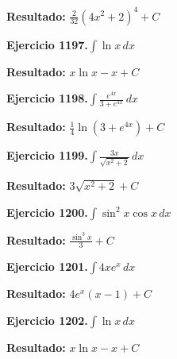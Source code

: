 \documentclass[10pt,a4paper]{article}
\begin{document}
\begin{solbox}
\textbf{Resultado:} \(\displaystyle \frac{2}{32}(4x^2+2)^{4} + C\)
\end{solbox}

\begin{ejbox}
\textbf{Ejercicio 1197.}\quad $\int \ln x\,dx$
\end{ejbox}

\begin{solbox}
\textbf{Resultado:} \(\displaystyle x\ln x - x + C\)
\end{solbox}

\newpage
\begin{ejbox}
\textbf{Ejercicio 1198.}\quad $\int \frac{e^{4x}}{3+e^{4x}}\,dx$
\end{ejbox}

\begin{solbox}
\textbf{Resultado:} \(\displaystyle \frac{1}{4}\ln(3+e^{4x}) + C\)
\end{solbox}

\begin{ejbox}
\textbf{Ejercicio 1199.}\quad $\int \frac{3x}{\sqrt{x^2+2}}\,dx$
\end{ejbox}

\begin{solbox}
\textbf{Resultado:} \(\displaystyle 3\sqrt{x^2+2} + C\)
\end{solbox}

\begin{ejbox}
\textbf{Ejercicio 1200.}\quad $\int \sin^{2}x \cos x\,dx$
\end{ejbox}

\begin{solbox}
\textbf{Resultado:} \(\displaystyle \frac{\sin^{3}x}{3} + C\)
\end{solbox}

\newpage
\begin{ejbox}
\textbf{Ejercicio 1201.}\quad $\int 4x e^{x}\,dx$
\end{ejbox}

\begin{solbox}
\textbf{Resultado:} \(\displaystyle 4e^x(x-1) + C\)
\end{solbox}

\begin{ejbox}
\textbf{Ejercicio 1202.}\quad $\int \ln x\,dx$
\end{ejbox}

\begin{solbox}
\textbf{Resultado:} \(\displaystyle x\ln x - x + C\)
\end{solbox}
\end{document}
